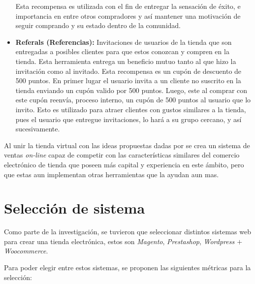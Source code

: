 \begin{itemize}
        Esta recompensa es utilizada con el fin de entregar la sensación de éxito,
        e importancia en entre otros compradores y así mantener una motivación
        de seguir comprando y su estado dentro de la comunidad.

    \item {\bf Referals (Referencias):}
        Invitaciones de usuarios de la tienda que son entregadas a posibles
        clientes para que estos conozcan y compren en la tienda.
        Esta herramienta entrega un beneficio mutuo tanto al que hizo la invitación
        como al invitado. Esta recompensa es un cupón de descuento de 500 puntos.
        En primer lugar el usuario invita a un cliente no suscrito en la tienda
        enviando un cupón valido por 500 puntos.
        Luego, este al comprar con este cupón reenvía,
        proceso interno, un cupón de 500 puntos al usuario que lo invito.
        Esto es utilizado para atraer clientes con gustos similares
        a la tienda, pues el usuario que entregue invitaciones, lo hará a su
        grupo cercano, y así sucesivamente.

\end{itemize}

Al unir la tienda virtual con las ideas propuestas dadas por {\GAM} se crea un
sistema de ventas \emph{on-line} capaz de competir con las características similares del
comercio electrónico de tienda que poseen más capital y experiencia en este ámbito,
pero que estas aun implementan otras herramientas que la ayudan aun mas.

\section{Selección de sistema}

Como parte de la investigación, se tuvieron que seleccionar distintos sistemas web para
crear una tienda electrónica, estos son \emph{Magento}, \emph{Prestashop}, \emph{Wordpress
$+$ Woocommerce}.

Para poder elegir entre estos sistemas, se proponen las siguientes métricas para
la selección:

